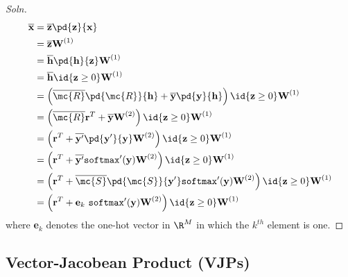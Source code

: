 \documentclass{article}
\begin{document}
	\subsubsection{}
	\begin{proof}[Soln]
		\begin{align}
			\overline{\textbf{x}} &= \overline{\textbf{z}} \pd{\textbf{z}}{\textbf{x}}\\
			&= \overline{\textbf{z}} \textbf{W}^{(1)} \\
			&= \overline{\textbf{h}} \pd{\textbf{h}}{\textbf{z}} \textbf{W}^{(1)} \\
			&= \overline{\textbf{h}} \id{\textbf{z} \geq 0} \textbf{W}^{(1)} \\
			&= \left (
			\overline{\mc{R}} \pd{\mc{R}}{\textbf{h}}
			+ \overline{\textbf{y}} \pd{\textbf{y}}{\textbf{h}}
			\right)
			\id{\textbf{z} \geq 0} \textbf{W}^{(1)} \\
			&= \left (
			\overline{\mc{R}} \textbf{r}^T
			+ \overline{\textbf{y}} \textbf{W}^{(2)}
			\right)
			\id{\textbf{z} \geq 0} \textbf{W}^{(1)} \\
			&= \left (
			\textbf{r}^T
			+ \overline{\textbf{y}'} \pd{\textbf{y}'}{\textbf{y}} \textbf{W}^{(2)}
			\right)
			\id{\textbf{z} \geq 0} \textbf{W}^{(1)} \\
			&= \left (
			\textbf{r}^T
			+ \overline{\textbf{y}'} \texttt{softmax}'(\textbf{y}) \textbf{W}^{(2)}
			\right)
			\id{\textbf{z} \geq 0} \textbf{W}^{(1)} \\
			&= \left (
			\textbf{r}^T
			+ \overline{\mc{S}} \pd{\mc{S}}{\textbf{y}'} \texttt{softmax}'(\textbf{y}) \textbf{W}^{(2)}
			\right)
			\id{\textbf{z} \geq 0} \textbf{W}^{(1)} \\
			&= \left (
			\textbf{r}^T
			+ \textbf{e}_k\ \texttt{softmax}'(\textbf{y}) \textbf{W}^{(2)}
			\right)
			\id{\textbf{z} \geq 0} \textbf{W}^{(1)}
		\end{align}
		where \textbf{e}$_k$ denotes the one-hot vector in $\R^M$ in which the $k^{th}$ element is one.
	\end{proof}
	\subsection{Vector-Jacobean Product (VJPs)}
	\subsubsection{}
	\subsubsection{}
\end{document}

